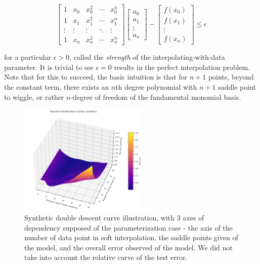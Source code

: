 \documentclass[10pt]{article}
\begin{document}
\begin{equation}\label{eq:soft_hard_interpolation}
\begin{bmatrix}
1 & x_0 & x_0^2 & \cdots & x_0^n \\
1 & x_1 & x_1^2 & \cdots & x_1^n \\
\vdots & \vdots & \vdots & \ddots & \vdots \\
1 & x_n & x_n^2 & \cdots & x_n^n
\end{bmatrix}
\begin{bmatrix}
a_0 \\
a_1 \\
\vdots \\
a_n
\end{bmatrix}
- 
\begin{bmatrix}
f(x_0) \\
f(x_1) \\
\vdots \\
f(x_n)
\end{bmatrix}
\leq \epsilon
\end{equation}

for a particular $\epsilon > 0$, called the \textit{strength} of the interpolating-with-data parameter. It is trivial to see $\epsilon = 0$ results in the perfect interpolation problem. Note that for this to succeed, the basic intuition is that for $n+1$ points, beyond the constant term, there exists an $n$th degree polynomial with $n+1$ saddle point to wiggle, or rather $n$-degree of freedom of the fundamental monomial basis. 

\begin{figure}[htb]
    \centering
    \includegraphics[width=0.55\textwidth]{media/double_descent_synthetic.png}
    \caption{Synthetic double descent curve illustration, with 3 axes of dependency supposed of the parameterization case - the axis of the number of data point in soft interpolation, the saddle points given of the model, and the overall error observed of the model. We did not take into account the relative curve of the test error.}
    \label{fig:descent_synthetic_curve}
\end{figure}
\end{document}
